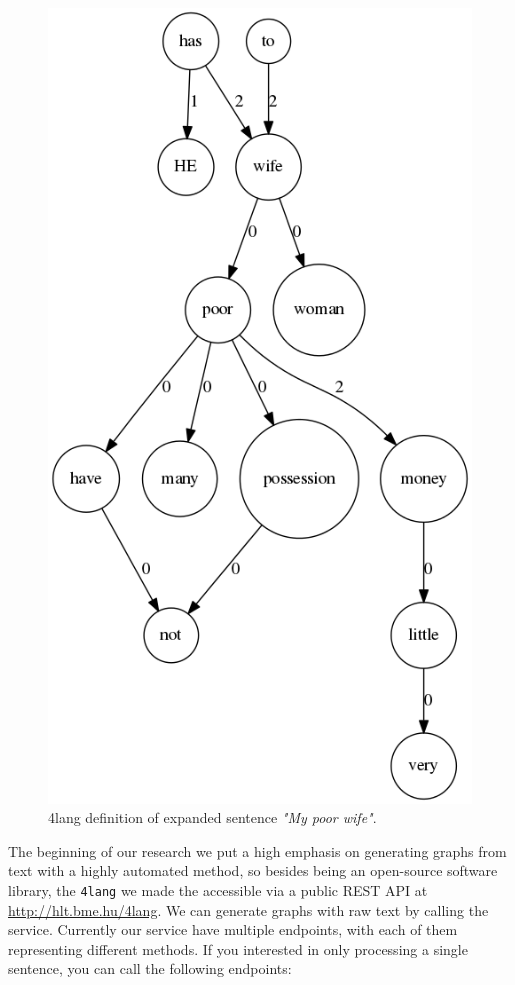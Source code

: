 \begin{figure}
	\centering
	\includegraphics[scale=0.5]{figures/mypoorexpanded}
	\caption{4lang definition of expanded sentence \textit{"My poor wife"}.}
	\label{fig:mypoorexpanded}
\end{figure}

The beginning of our research we put a high emphasis on generating graphs from text with a highly automated method, so besides being an open-source software library,
the \texttt{4lang} we made the accessible via a public
REST API at \url{http://hlt.bme.hu/4lang}. We can generate graphs with raw text by calling the service. Currently our service have multiple endpoints, with each of them representing different methods.
If you interested in only processing a single sentence, you can call the following endpoints:

